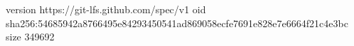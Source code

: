 version https://git-lfs.github.com/spec/v1
oid sha256:54685942a8766495e84293450541ad869058ecfe7691e828e7e6664f21c4e3bc
size 349692
